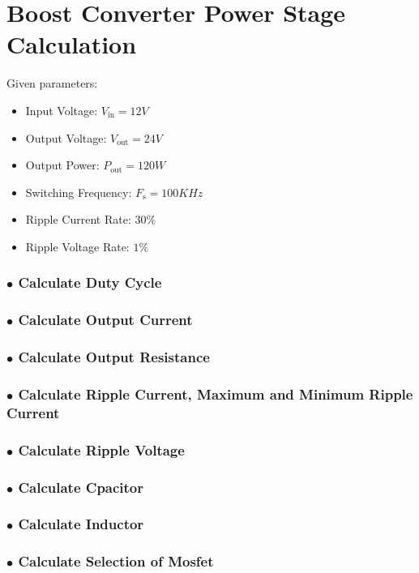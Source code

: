 \documentclass{article}
\begin{document}
\section*{Boost Converter Power Stage Calculation}

Given parameters:
\begin{itemize}
    \item Input Voltage: \( V_{\text{in}} =  12V\)
    \item Output Voltage: \(V_{\text{out}} = 24V\)
    \item Output Power: \(P_{\text{out}} = 120W\)
    \item Switching Frequency: \(F_\text{s} = 100KHz\)
    \item Ripple Current Rate: \(30\%\)
    \item Ripple Voltage Rate: \(1\%\)
\end{itemize}
\subsubsection*{$\bullet$ Calculate Duty Cycle}
\subsubsection*{$\bullet$ Calculate Output Current}
\subsubsection*{$\bullet$ Calculate Output Resistance}
\subsubsection*{$\bullet$ Calculate Ripple Current, Maximum and Minimum Ripple Current }
\subsubsection*{$\bullet$ Calculate Ripple Voltage}
\subsubsection*{$\bullet$ Calculate Cpacitor}
\subsubsection*{$\bullet$ Calculate Inductor}
\subsubsection*{$\bullet$ Calculate Selection of Mosfet}
\end{document}
